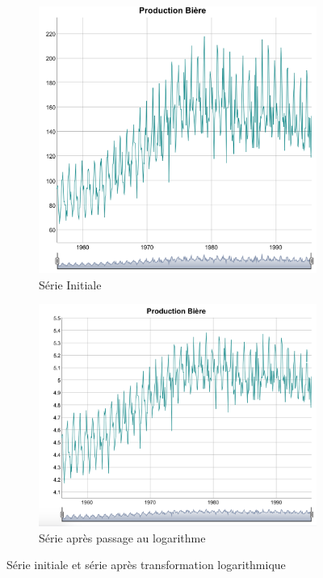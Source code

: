 \documentclass[12pt,a4paper]{book}
\newcommand{\1}{\mathds{1}}
\begin{document}
\begin{figure}[h]
\centering
	\begin{subfigure}{.3\textwidth}
    	\includegraphics[width=\textwidth]{plot_beer}  
    	\caption{Série Initiale}
    	\label{fig:sub1}
    \end{subfigure}
    \begin{subfigure}{.4\textwidth}
    	\includegraphics[width=\textwidth]{plot_log_beer}  
    	\caption{Série après passage au logarithme}
    	\label{fig:sub2}
    \end{subfigure}

\caption{Série initiale et série après transformation logarithmique}
\label{fig:1}
\end{figure}
\end{document}
